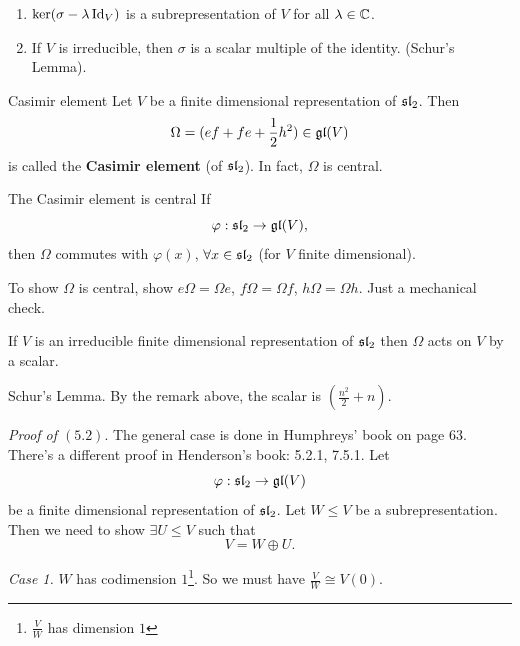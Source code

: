 \documentclass{article}
\begin{document}
\begin{enumerate}
    \item $\ker(\sigma - \lambda \operatorname{Id}_{V})$ is a subrepresentation of $V$ for all $\lambda \in \mathbb{C}$.
    \item If $V$ is irreducible, then $\sigma$ is a scalar multiple of the identity. (Schur's Lemma).
\end{enumerate}
\begin{fancydefine}{Casimir element}
    Let $V$ be a finite dimensional representation of $\mathfrak{sl}_{2}$. Then \[\Omega = (ef + fe + \frac{1}{2}h^{2}) \in \mathfrak{gl}(V)\] is called the \textbf{Casimir element} (of $\mathfrak{sl}_{2}$). In fact, $\Omega$ is central.
\end{fancydefine}
\begin{fancylem}{The Casimir element is central}
    If \[ \varphi : \mathfrak{sl}_{2} \to \mathfrak{gl}(V), \] then $\Omega$ commutes with $\varphi(x)$, $\forall x \in \mathfrak{sl}_{2}$ (for $V$ finite dimensional).
\end{fancylem}
\proof
    To show $\Omega$ is central, show $e\Omega = \Omega e$, $f\Omega = \Omega f$, $h \Omega = \Omega h$. Just a mechanical check. 
\endproof
\begin{corr}{}
    If $V$ is an irreducible finite dimensional representation of $\mathfrak{sl}_{2}$ then $\Omega$ acts on $V$ by a scalar.\\ \hspace{0.1cm}
\end{corr}
\proof Schur's Lemma. By the remark above, the scalar is $(\frac{n^2}{2} + n)$. \endproof

\textit{Proof of $\mathit{(5.2)}$}. The general case is done in Humphreys' book on page $63$. There's a different proof in Henderson's book: 5.2.1, 7.5.1. \gap
Let \[ \varphi : \mathfrak{sl}_{2} \to \mathfrak{gl}(V) \] be a finite dimensional representation of $\mathfrak{sl}_{2}$. Let $W \leq V$ be a subrepresentation. Then we need to show $\exists U \leq V$ such that \[ V = W \oplus U. \]\gap 

\textit{Case 1.} $W$ has codimension $1$\footnote{$\frac{V}{W}$ has dimension $1$}. So we must have $\frac{V}{W} \cong V(0)$. \\
\end{document}
